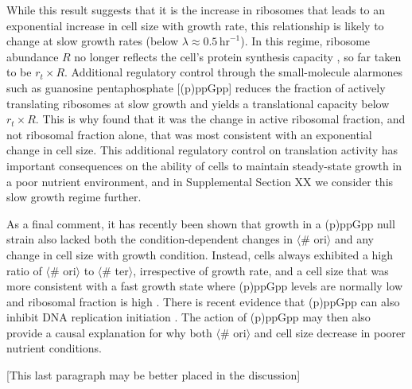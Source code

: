 
While this result suggests that it is the increase in ribosomes that leads to an
exponential increase in cell size with growth rate, this
relationship is likely to change at slow growth rates (below $\lambda \approx
0.5\,\text{hr}^{-1}$). In this regime, ribosome abundance $R$ no longer reflects
the cell's protein synthesis capacity \citep{dai2016}, so far taken to be $r_t
\times R$. Additional regulatory control through the small-molecule alarmones
such as guanosine pentaphosphate [(p)ppGpp] reduces the fraction of actively
translating ribosomes at slow growth and yields a translational capacity below
$r_t\times R$. This is why \cite{si2017} found that it was the change in active
ribosomal fraction, and not ribosomal fraction alone, that was most consistent
with an exponential change in cell size. This additional regulatory control on
translation activity has important consequences on the ability of cells to
maintain steady-state growth in a poor nutrient environment, and in Supplemental
Section XX we consider this slow growth regime further.

As a final comment, it has recently been shown that growth in a (p)ppGpp null
strain also lacked both the condition-dependent changes in $\langle$\#
ori$\rangle$ and any change in cell size with growth condition. Instead, cells
always exhibited a high ratio of $\langle$\# ori$\rangle$ to $\langle$\#
ter$\rangle$, irrespective of growth rate, and a cell size that was more
consistent with a fast growth state where (p)ppGpp levels are normally low
\citep{fernandezcoll2020} and ribosomal fraction is high \citep{zhu2019}. There
is recent evidence that (p)ppGpp can also inhibit DNA replication initiation
\citep{kraemer2019}.  The action of (p)ppGpp  may then also provide a causal
explanation for why both $\langle$\# ori$\rangle$ and cell size decrease in
poorer nutrient conditions.

[This last paragraph may be better placed in the discussion]

